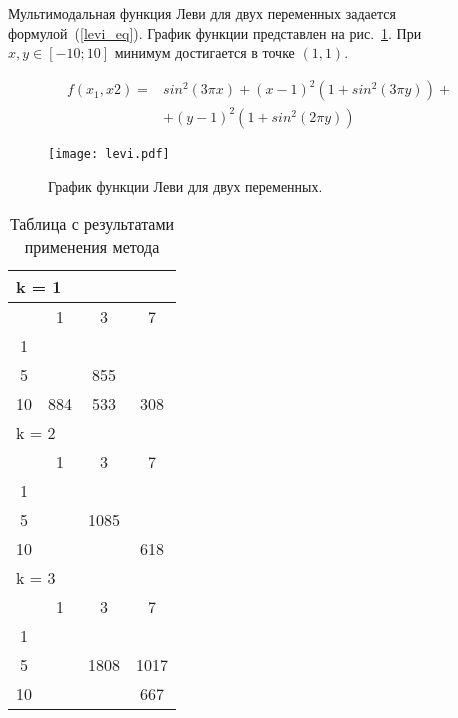 Мультимодальная функция Леви для двух переменных задается формулой~(\ref{levi_eq}). График функции представлен на рис.~\ref{levi_plot}. При $x, y \in [-10; 10]$ минимум достигается в точке $(1, 1)$.

\begin{equation}
\label{levi_eq}
\begin{split}
f(x_1, x2) = &sin^2(3\pi x) + (x - 1)^2(1 + sin^2(3\pi y)) + \\
& + (y - 1)^2(1 + sin^2(2\pi y))
\end{split}
\end{equation}

\begin{figure}
    \centering
    \texttt{[image: levi.pdf]}
    \caption{График функции Леви для двух переменных.}
    \label{levi_plot}
\end{figure}

\begin{table}
  \centering
  \begin{tabular}{|*4{c|}}
    \hline
    \multicolumn{4}{|l|}{k = 1} \\
    \hline
    \diagbox{$\mu$}{$\lambda$} & \multicolumn{1}{c|}{1} & \multicolumn{1}{c|}{3} & \multicolumn{1}{c|}{7} \\
    \hline
    1& \cellcolor{olive}{3496} & \cellcolor{olive}{1980} & \cellcolor{olive}{1321} \\
    \hline
    5& \cellcolor{olive}{1778} & 855 & \cellcolor{olive}{356} \\
    \hline
    10 & 884 & 533 & 308 \\
    \hline
    \multicolumn{4}{|l|}{k = 2} \\
    \hline
    \diagbox{$\mu$}{$\lambda$} & \multicolumn{1}{c|}{1} & \multicolumn{1}{c|}{3} & \multicolumn{1}{c|}{7} \\
    \hline
    1 & \cellcolor{olive}{4947} & \cellcolor{olive}{2020} & \cellcolor{olive}{1205} \\
    \hline
    5 & \cellcolor{olive}{1935} & 1085 & \cellcolor{olive}{770} \\
    \hline
    10 & \cellcolor{olive}{1803} & \cellcolor{olive}{887} & 618 \\
    \hline
    \multicolumn{4}{|l|}{k = 3} \\
    \hline
    \diagbox{$\mu$}{$\lambda$} & \multicolumn{1}{c|}{1} & \multicolumn{1}{c|}{3} & \multicolumn{1}{c|}{7} \\
    \hline
    1 & \cellcolor{olive}{5216}& \cellcolor{olive}{2900} & \cellcolor{olive}{1700} \\
    \hline
    5 & \cellcolor{olive}{3105} & 1808 & 1017 \\
    \hline
    10 & \cellcolor{olive}{2071}& \cellcolor{olive}{1330} & 667 \\
    \hline
  \end{tabular}
  \captionsetup{justification=centering}
  \caption{Таблица с результатами применения метода }
\end{table}

